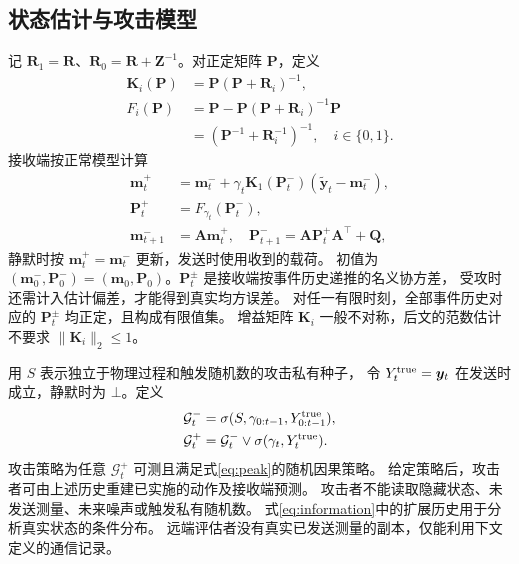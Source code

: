 \subsection{状态估计与攻击模型}
记 ${\bm{R}}_1={\bm{R}}$、${\bm{R}}_0={\bm{R}}+{\bm{Z}}^{-1}$。对正定矩阵 ${\bm{P}}$，定义
\begin{equation}
 \begin{aligned}
 {\bm{K}}_i({\bm{P}})&={\bm{P}}({\bm{P}}+{\bm{R}}_i)^{-1},\\
 F_i({\bm{P}})&={\bm{P}}-{\bm{P}}({\bm{P}}+{\bm{R}}_i)^{-1}{\bm{P}}\\
       &=({\bm{P}}^{-1}+{\bm{R}}_i^{-1})^{-1},\quad i\in\{0,1\}.
 \end{aligned}
 \label{eq:gains}
\end{equation}
接收端按正常模型计算
\begin{equation}
 \begin{aligned}
 {\bm{m}}_t^+&={\bm{m}}_t^-+\gamma_t{\bm{K}}_1({\bm{P}}_t^-)(\widetilde {\bm{y}}_t-{\bm{m}}_t^-),\\
 {\bm{P}}_t^+&=F_{\gamma_t}({\bm{P}}_t^-),\\
 {\bm{m}}_{t+1}^-&={\bm{A}}{\bm{m}}_t^+,\quad {\bm{P}}_{t+1}^-={\bm{A}}{\bm{P}}_t^+{\bm{A}}^\top+{\bm{Q}},
 \end{aligned}
 \label{eq:receiver}
\end{equation}
静默时按 ${\bm{m}}_t^+={\bm{m}}_t^-$ 更新，发送时使用收到的载荷。
初值为 $({\bm{m}}_0^-,{\bm{P}}_0^-)=({\bm{m}}_0,{\bm{P}}_0)$。${\bm{P}}_t^\pm$ 是接收端按事件历史递推的名义协方差，
受攻时还需计入估计偏差，才能得到真实均方误差。
对任一有限时刻，全部事件历史对应的 ${\bm{P}}_t^\pm$ 均正定，且构成有限值集。
增益矩阵 ${\bm{K}}_i$ 一般不对称，后文的范数估计不要求 $\|{\bm{K}}_i\|_2\le1$。

用 $S$ 表示独立于物理过程和触发随机数的攻击私有种子，
令 $Y_t^{\rm true}={\bm{y}}_t$ 在发送时成立，静默时为 $\bot$。定义
\begin{equation}
 \begin{aligned}
 \mathcal G_t^-&=\sigma(S,\gamma_{0:t-1},Y_{0:t-1}^{\rm true}),\\
 \mathcal G_t^+&=\mathcal G_t^-\vee\sigma(\gamma_t,Y_t^{\rm true}).
 \end{aligned}
 \label{eq:information}
\end{equation}
攻击策略为任意 $\mathcal G_t^+$ 可测且满足式\eqref{eq:peak}的随机因果策略。
给定策略后，攻击者可由上述历史重建已实施的动作及接收端预测。
攻击者不能读取隐藏状态、未发送测量、未来噪声或触发私有随机数。
式\eqref{eq:information}中的扩展历史用于分析真实状态的条件分布。
远端评估者没有真实已发送测量的副本，仅能利用下文定义的通信记录。

